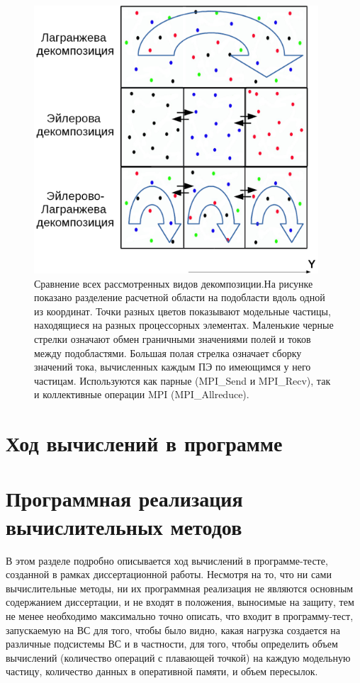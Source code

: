 \begin{figure}[ht]
\begin{center}
\includegraphics[height=10cm,keepaspectratio]{images/decomp_all.png}
\end{center}
\caption{Сравнение всех рассмотренных видов декомпозиции.На рисунке показано разделение расчетной области на подобласти вдоль одной из координат. Точки разных цветов показывают модельные частицы, находящиеся на разных процессорных  элементах. Маленькие черные стрелки означают обмен граничными значениями полей и токов между подобластями. Большая полая стрелка означает сборку значений тока, вычисленных каждым ПЭ по имеющимся у него частицам. Используются как  парные (MPI\_Send и MPI\_Recv), так и коллективные операции MPI (MPI\_Allreduce).}
\label{decomp_all}
\end{figure}



\clearpage

\section{Ход вычислений в программе}


\section{Программная реализация вычислительных методов}
   В этом разделе подробно описывается ход вычислений в программе-тесте, созданной в рамках диссертационной работы. Несмотря на то, что ни сами вычислительные методы, ни их программная реализация не являются основным содержанием диссертации, и не входят в положения, выносимые на защиту, тем не менее необходимо максимально точно описать, что входит в программу-тест, запускаемую на ВС для того, чтобы было видно, какая нагрузка создается на различные подсистемы ВС и в частности, для того, чтобы определить объем вычислений (количество операций с плавающей точкой) на каждую модельную частицу, количество данных в оперативной памяти, и объем пересылок.
   

